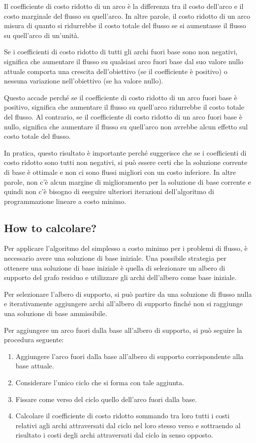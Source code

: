 Il coefficiente di costo ridotto di un arco è la differenza tra il costo dell'arco e il costo marginale del flusso su quell'arco. In altre parole, il costo ridotto di un arco misura di quanto si ridurrebbe il costo totale del flusso se si aumentasse il flusso su quell'arco di un'unità.

Se i coefficienti di costo ridotto di tutti gli archi fuori base sono non negativi, significa che aumentare il flusso su qualsiasi arco fuori base dal suo valore nullo attuale comporta una crescita dell'obiettivo (se il coefficiente è positivo) o nessuna variazione nell'obiettivo (se ha valore nullo).

Questo accade perché se il coefficiente di costo ridotto di un arco fuori base è positivo, significa che aumentare il flusso su quell'arco ridurrebbe il costo totale del flusso. Al contrario, se il coefficiente di costo ridotto di un arco fuori base è nullo, significa che aumentare il flusso su quell'arco non avrebbe alcun effetto sul costo totale del flusso.

In pratica, questo risultato è importante perché suggerisce che se i coefficienti di costo ridotto sono tutti non negativi, si può essere certi che la soluzione corrente di base è ottimale e non ci sono flussi migliori con un costo inferiore. In altre parole, non c'è alcun margine di miglioramento per la soluzione di base corrente e quindi non c'è bisogno di eseguire ulteriori iterazioni dell'algoritmo di programmazione lineare a costo minimo.

\subsection{How to calcolare?}
Per applicare l'algoritmo del simplesso a costo minimo per i problemi di flusso, è necessario avere una soluzione di base iniziale. Una possibile strategia per ottenere una soluzione di base iniziale è quella di selezionare un albero di supporto del grafo residuo e utilizzare gli archi dell'albero come base iniziale. 

Per selezionare l'albero di supporto, si può partire da una soluzione di flusso nulla e iterativamente aggiungere archi all'albero di supporto finché non si raggiunge una soluzione di base ammissibile. 

Per aggiungere un arco fuori dalla base all'albero di supporto, si può seguire la procedura seguente:

\begin{enumerate}
\item Aggiungere l'arco fuori dalla base all'albero di supporto corrispondente alla base attuale.
\item Considerare l'unico ciclo che si forma con tale aggiunta.
\item Fissare come verso del ciclo quello dell'arco fuori dalla base.
\item Calcolare il coefficiente di costo ridotto sommando tra loro tutti i costi relativi agli archi attraversati dal ciclo nel loro stesso verso e sottraendo al risultato i costi degli archi attraversati dal ciclo in senso opposto.
\end{enumerate}

